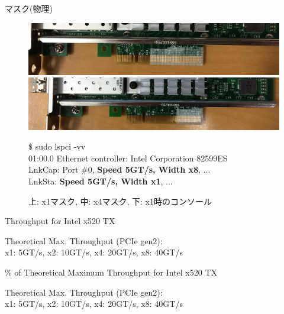 \documentclass[10pt, compress]{beamer}
\begin{document}
\begin{frame}{マスク(物理)}

\begin{figure}
\includegraphics[width=.9\textwidth]{pic/x1.png} \\
\includegraphics[width=.9\textwidth]{pic/x4.png}

\begin{scriptsize}
\begin{tcolorbox}[]
\$ sudo lspci -vv\\
01:00.0 Ethernet controller: Intel Corporation 82599ES\\
LnkCap: Port \#0, \textbf{Speed 5GT/s, Width x8}, ... \\
LnkSta: \textbf{Speed 5GT/s, Width x1}, ...
\end{tcolorbox}
\end{scriptsize}
\vspace{-.5em}
\small{上: x1マスク, 中: x4マスク, 下: x1時のコンソール}
\end{figure}


\end{frame}


\begin{frame}{Throughput for Intel x520 TX}
	\begin{figure}
		\resizebox{.7\textwidth}{!}{}
	\end{figure}
	{\footnotesize Theoretical Max. Throughput (PCIe gen2): \\ x1: 5GT/s, x2: 10GT/s, x4: 20GT/s, x8: 40GT/s}
\end{frame}


\begin{frame}{\% of Theoretical Maximum Throughput for Intel x520 TX}
	\begin{figure}
		\resizebox{.7\textwidth}{!}{}
	\end{figure}
	{\footnotesize Theoretical Max. Throughput (PCIe gen2): \\ x1: 5GT/s, x2: 10GT/s, x4: 20GT/s, x8: 40GT/s}
\end{frame}
\end{document}
